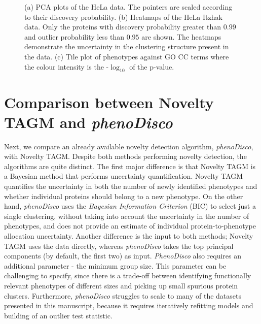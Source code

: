 \documentclass[12pt,english]{article}
\begin{document}
\begin{figure}
\begin{subfigure}[t]{\textwidth}
	\caption{}
\end{subfigure}
	\caption{(a) PCA plots of the HeLa data. The pointers are scaled according to their discovery probability. (b) Heatmaps of the HeLa Itzhak data. Only the proteins with discovery probability greater than $0.99$ and outlier probability less than $0.95$ are shown. The heatmaps demonstrate the uncertainty in the clustering structure present in the data. (c) Tile plot of phenotypes against GO CC terms where the colour intensity is the -$\log_{10}$ of the p-value.}
	\label{figure:DOM}
\end{figure}
\clearpage
\section{Comparison between Novelty TAGM and \textit{phenoDisco}}
Next, we compare an already available novelty detection algorithm, \textit{phenoDisco}, with Novelty TAGM. Despite both methods performing novelty detection, the algorithms
are quite distinct. The first major difference is that Novelty TAGM is a Bayesian 
method that performs uncertainty quantification. Novelty TAGM quantifies the uncertainty in both the number of newly identified phenotypes and whether individual proteins should belong to a new phenotype. On the other hand, \textit{phenoDisco} uses the \textit{Bayesian Information Criterion} (BIC) to select just a single clustering, without taking into account the uncertainty in the number of phenotypes, and does not provide an estimate of individual protein-to-phenotype allocation uncertainty. Another difference is the input to both methods; Novelty TAGM uses the data directly, whereas \textit{phenoDisco} takes the top principal components (by default, the first two) as input. \textit{PhenoDisco} also requires an additional parameter - the minimum group size. This parameter can be challenging to specify, since there is a trade-off between identifying functionally relevant phenotypes of different sizes and picking up small spurious protein clusters. Furthermore, \textit{phenoDisco} struggles to scale to many of the datasets presented in this manuscript, because it requires iteratively refitting models and building of an outlier test statistic. 
\end{document}
